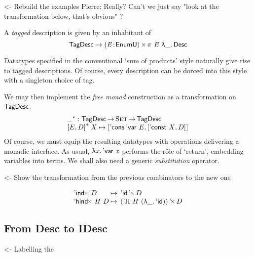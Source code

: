 \documentclass[preprint, authoryear, onecolumn]{sigplanconf}
\newenvironment{structure}{\footnotesize\verbatim}{\endverbatim}
\begin{document}
\begin{structure}
<- Rebuild the examples
Pierre: Really? Can't we just say "look at the transformation below, that's obvious" ?
\end{structure}

A \emph{tagged} description is given by an inhabitant of
\[
 \F{TagDesc} \mapsto \SIGMA{\V{E}}{\EnumU}\spi{\V{E}}{\LAM{\_}\Desc}
\]


\newcommand{\FM}[1]{{#1}^{\F{\(\ast\)}}}
Datatypes specified in the conventional `sum of products' style naturally give rise to tagged descriptions. Of course, every description can be dorced into this style with a singleton choice of tag.

We may then implement the \emph{free monad} construction as a
transformation on \(\F{TagDesc}\).
\[\stk{
\FM{\_} : \F{TagDesc} \To \Set \To \F{TagDesc} \\
\FM{\pair{E}{D}{}}\:X \mapsto
\pair{\ListCons{\:\DVar{}}{E}}{\pair{\DConst{X}}{D}{}}{}
}\]
Of course, we must equip the resulting datatypes with operations delivering a monadic interface. As usual, \(\LAM{\x}\DVar{\x}\) performs the r\^ole of `return', embedding variables into terms. We shall also need a generic \emph{substitution} operator.

\begin{structure}
<- Show the transformation from the previous combinators to the new one
\end{structure}

\[\begin{array}{l@{\:\mapsto\:\:}l}
\DIndx{D}         & \DProd{\DId}{D}                      \\
\DHindx{H}{D}     & \DProd{(\DPi{H}{(\LAM{\_} \DId)})}{D}
\end{array}
\]


\subsection{From Desc to IDesc}

\begin{structure}
<- Labelling the \DId
\end{structure}

\end{document}

